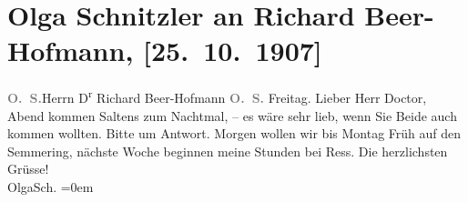 

         
         \renewcommand{\erwaehntePersonen}{Personen: Richard Beer-Hofmann, Paula Beer-Hofmann, Johann Ress, Felix Salten, Ottilie Salten}
         \renewcommand{\erwaehnteOrte}{Orte: Semmering, Wien}
         \renewcommand{\erwaehnteWerke}{}
               \section[Olga Schnitzler an Richard Beer-Hofmann, {[}25. 10. 1907{]}]{ Olga Schnitzler an Richard Beer-Hofmann, {[}25. 10. 1907{]}}\nopagebreak{}\rehead{ }\begin{ledgroupsized}[t]{13cm}\normalsize\beginnumbering \toendnotes[C]{\smallbreak\pagebreak[2]} 
\toendnotes[C]{\smallbreak}\pstart{}{\pb}\textcolor{gray}{\textbf{O. S.}}\pend{}{\bigskip}\pstart{}{\pb}Herrn D\textsuperscript{r} Richard
                  Beer-Hofmann \pend{}{\bigskip}\pstart
           \noindent{}{\pb}\textcolor{gray}{\textbf{O. S.}}\pend
           \pstart
           Freitag.\pend
           \pstart
           Lieber Herr Doctor,{ }\label{K_L01726-1v}\label{K_L01726-1h}{ }Abend kommen Saltens zum
               Nachtmal, – es wäre sehr lieb, wenn Sie Beide auch {\pb}kommen wollten.
               Bitte um Antwort. Morgen wollen wir bis Montag Früh auf den Semmering, nächste Woche beginnen meine Stunden bei Ress.\pend
           \pstart
           Die herzlichsten Grüsse!{\\[\baselineskip]}\spacefill\mbox{OlgaSch.}\pend
           \leftskip=0em{}
         
         \endnumbering{}\end{ledgroupsized}  \newcommand{\dateiname}{L01726}\newcommand{\titel}{Olga Schnitzler an Richard Beer-Hofmann, [25. 10. 1907]}\newcommand{\editorInnen}{Martin Anton Müller und Gerd-Hermann Susen}
      
